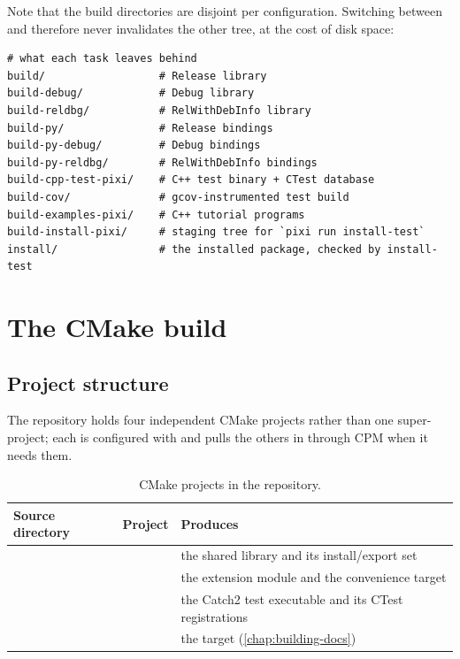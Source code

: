 Note that the build directories are disjoint per configuration. Switching
between  and  therefore never invalidates the other
tree, at the cost of disk space:

\begin{lstlisting}[language=shell]
# what each task leaves behind
build/                  # Release library
build-debug/            # Debug library
build-reldbg/           # RelWithDebInfo library
build-py/               # Release bindings
build-py-debug/         # Debug bindings
build-py-reldbg/        # RelWithDebInfo bindings
build-cpp-test-pixi/    # C++ test binary + CTest database
build-cov/              # gcov-instrumented test build
build-examples-pixi/    # C++ tutorial programs
build-install-pixi/     # staging tree for `pixi run install-test`
install/                # the installed package, checked by install-test
\end{lstlisting}

\section{The CMake build}
\label{sec:dev-cmake}

\subsection{Project structure}

The repository holds four independent CMake projects rather than one
super-project; each is configured with  and
pulls the others in through CPM when it needs them.

\begin{table}[H]
  \centering
  \caption{CMake projects in the repository.}
  \label{tab:dev-cmake-projects}
  \small
  \begin{tabularx}{\textwidth}{llL}
    \toprule
    Source directory & Project & Produces \\
    \midrule
                 &         & the shared library  and its
                                                    install/export set \\
     & & the  extension module and the
                                                     convenience target \\
            &  & the Catch2 test executable and its CTest
                                                    registrations \\
                &   & the  target
                                                    (\cref{chap:building-docs}) \\
    \bottomrule
  \end{tabularx}
\end{table}

